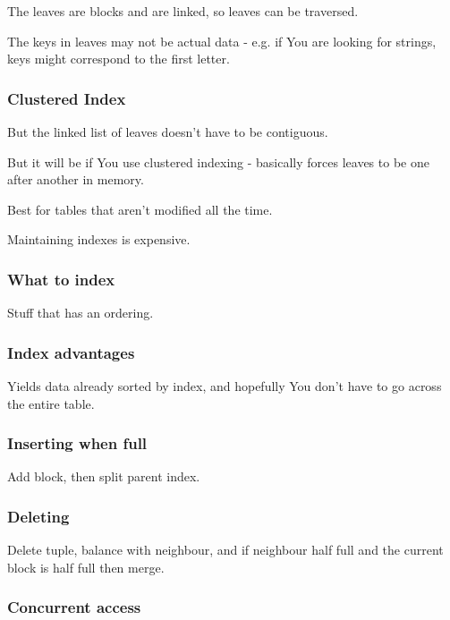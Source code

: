 \documentclass{article}
\begin{document}
				The leaves are blocks and are linked, so leaves can be traversed.
				
				The keys in leaves may not be actual data - e.g. if You are looking for strings, keys might correspond to the first letter.
				
			\subsubsection{Clustered Index}
			
				But the linked list of leaves doesn't have to be contiguous.
				
				But it will be if You use clustered indexing - basically forces leaves to be one after another in memory.
				
				Best for tables that aren't modified all the time.
				
				Maintaining indexes is expensive.
				
			\subsubsection{What to index}
			
				Stuff that has an ordering.
				
			\subsubsection{Index advantages}
			
				Yields data already sorted by index, and hopefully You don't have to go across the entire table.
				
			\subsubsection{Inserting when full}
			
				Add block, then split parent index.
				
			\subsubsection{Deleting}
				
				Delete tuple, balance with neighbour, and if neighbour half full and the current block is half full then merge.
				
			\subsubsection{Concurrent access}
			
\end{document}
